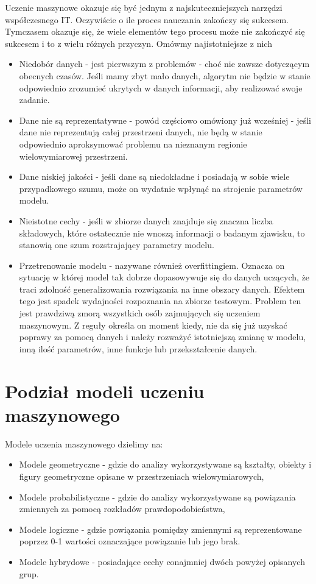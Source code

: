 \documentclass[10pt,a4paper]{book}
\begin{document}
Uczenie maszynowe okazuje się być jednym z najskuteczniejszych narzędzi współczesnego IT. Oczywiście o ile proces nauczania zakończy się sukcesem. Tymczasem okazuje się, że wiele elementów tego procesu może nie zakończyć się sukcesem i to z wielu różnych przyczyn. Omówmy najistotniejsze z nich
\begin{itemize}
\item Niedobór danych - jest pierwszym z problemów - choć nie zawsze dotyczącym obecnych czasów. Jeśli mamy zbyt mało danych, algorytm nie będzie w stanie odpowiednio zrozumieć ukrytych w danych informacji, aby realizować swoje zadanie.
\item Dane nie są reprezentatywne - powód częściowo omówiony już wcześniej - jeśli dane nie reprezentują całej przestrzeni danych, nie będą w stanie odpowiednio aproksymować problemu na nieznanym regionie wielowymiarowej przestrzeni.
\item Dane niskiej jakości - jeśli dane są niedokładne i posiadają w sobie wiele przypadkowego szumu, może on wydatnie wpłynąć na strojenie parametrów modelu. 
\item Nieistotne cechy - jeśli w zbiorze danych znajduje się znaczna liczba składowych, które ostatecznie nie wnoszą informacji o badanym zjawisku, to stanowią one szum rozstrajający parametry modelu.
\item Przetrenowanie modelu - nazywane również overfittingiem. Oznacza on sytuację w której model tak dobrze dopasowywuje się do danych uczących, że traci zdolność generalizowania rozwiązania na inne obszary danych. Efektem tego jest spadek wydajności rozpoznania na zbiorze testowym. Problem ten jest prawdziwą zmorą wszystkich osób zajmujących się uczeniem maszynowym. Z reguły określa on moment kiedy, nie da się już uzyskać poprawy za pomocą danych i należy rozważyć istotniejszą zmianę w modelu, inną ilość parametrów, inne funkcje lub przekształcenie danych.
\end{itemize}

\section{Podział modeli uczeniu maszynowego}

Modele uczenia maszynowego dzielimy na:
\begin{itemize}
\item Modele geometryczne - gdzie do analizy wykorzystywane są kształty, obiekty i figury geometryczne opisane w przestrzeniach wielowymiarowych,
\item Modele probabilistyczne - gdzie do analizy wykorzystywane są powiązania zmiennych za pomocą rozkładów prawdopodobieństwa,
\item Modele logiczne - gdzie powiązania pomiędzy zmiennymi są reprezentowane poprzez 0-1 wartości oznaczające powiązanie lub jego brak.
\item Modele hybrydowe - posiadające cechy conajmniej dwóch powyżej opisanych grup.
\end{itemize}
\end{document}
